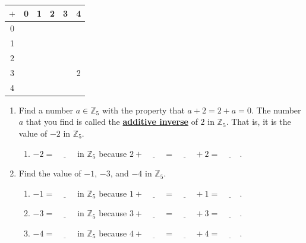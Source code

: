 \documentclass[11pt]{article}
\newenvironment{task}
	{\begin{mdframed}[linecolor=lightgray, linewidth=3pt]\raggedright}
	{\end{mdframed}}
\renewcommand\emph[1]{\underline{\bf{#1}}} %
\theoremstyle{definition}
\begin{document}
\begin{task}
  \begin{center}
    \begin{tabular}{|c|c|c|c|c|c|}\\ \hline
      $+$ & 0 & 1 & 2 & 3 & 4 \\ \hline
      0   &   &   &   &   &   \\ \hline
      1   &   &   &   &   &   \\ \hline
      2   &   &   &   &   &   \\ \hline
      3   &   &   &   &   & 2 \\ \hline
      4   &   &   &   &   &   \\ \hline
    \end{tabular}
  \end{center}
    \begin{enumerate}
      \item Find a number $a \in \mathbb{Z}_5$ with the property that $a + 2 = 2 + a = 0$. The number $a$ that you find is called the \emph{additive inverse} of $2$ in 
    $\mathbb{Z}_5$. That is, it is the value of $-2$ in $\mathbb{Z}_5$.
    \begin{enumerate}
      \item $-2 = \underline{\hspace{1cm}}$ in $\mathbb{Z}_5$ because $2 + \underline{\hspace{1cm}} = \underline{\hspace{1cm}} + 2 = \underline{\hspace{1cm}}$.
    \end{enumerate}
    \item Find the value of $-1$, $-3$, and $-4$ in $\mathbb{Z}_5$.
    \begin{enumerate}
      \item $-1 = \underline{\hspace{1cm}}$ in $\mathbb{Z}_5$ because $1 + \underline{\hspace{1cm}} = \underline{\hspace{1cm}} + 1 = \underline{\hspace{1cm}}$.
      \item $-3 = \underline{\hspace{1cm}}$ in $\mathbb{Z}_5$ because $3 + \underline{\hspace{1cm}} = \underline{\hspace{1cm}} + 3 = \underline{\hspace{1cm}}$.
      \item $-4 = \underline{\hspace{1cm}}$ in $\mathbb{Z}_5$ because $4 + \underline{\hspace{1cm}} = \underline{\hspace{1cm}} + 4 = \underline{\hspace{1cm}}$.
    \end{enumerate}
  \end{enumerate}


\end{task}
\end{document}
